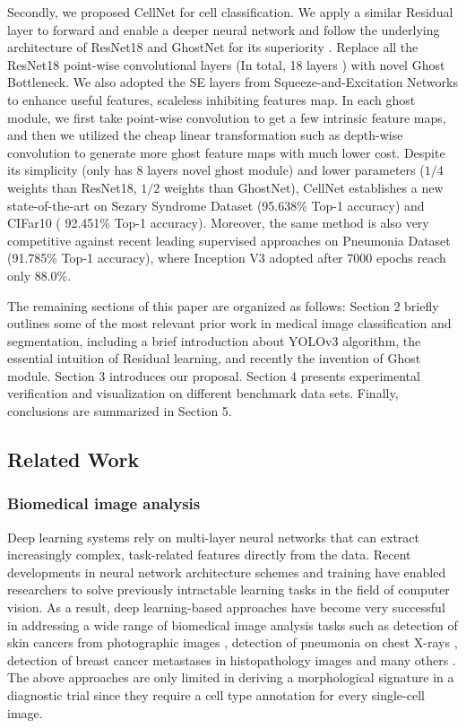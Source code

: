 Secondly, we proposed CellNet for cell classification. We apply a similar Residual layer to forward and enable a deeper neural network and follow the underlying architecture of ResNet18 and GhostNet for its superiority \cite{19}\cite{20}. Replace all the ResNet18 \cite{20} point-wise convolutional layers (In total, 18 layers ) with novel Ghost Bottleneck. We also adopted the SE layers from Squeeze-and-Excitation Networks \cite{24} to enhance useful features, scaleless inhibiting features map. In each ghost module, we first take point-wise convolution to get a few intrinsic feature maps, and then we utilized the cheap linear transformation such as depth-wise convolution to generate more ghost feature maps with much lower cost.
Despite its simplicity (only has 8 layers novel ghost module) and lower parameters ($1/4$ weights than ResNet18\cite{20}, $1/2$ weights than GhostNet\cite{19}), CellNet establishes a new state-of-the-art on Sezary Syndrome Dataset (95.638\% Top-1 accuracy) and CIFar10\cite{21} ( 92.451\% Top-1 accuracy). Moreover, the same method is also very competitive against recent leading supervised approaches on Pneumonia Dataset (91.785\% Top-1 accuracy), where Inception V3 adopted after 7000 epochs reach only 88.0\%\cite{38}. 

The remaining sections of this paper are organized as follows: Section 2 briefly outlines some of the most relevant prior work in medical image classification and segmentation, including a brief introduction about YOLOv3 \cite{33} algorithm, the essential intuition of Residual learning, and recently the invention of Ghost module.
Section 3 introduces our proposal. Section 4 presents experimental verification and visualization on different benchmark data sets. Finally, conclusions are summarized in Section 5.

\subsection{Related Work}
\subsubsection{Biomedical image analysis}

Deep learning systems rely on multi-layer neural networks that can extract increasingly complex, task-related features directly from the data. Recent developments in neural network architecture schemes and training have enabled researchers to solve previously intractable learning tasks in the field of computer vision. As a result, deep learning-based approaches have become very successful in addressing a wide range of biomedical image analysis tasks such as detection of skin cancers from photographic images \cite{10}, detection of pneumonia on chest X-rays \cite{13}, detection of breast cancer metastases in histopathology images and many others \cite{2}. 
The above approaches are only limited in deriving a morphological signature in a diagnostic trial since they require a cell type annotation for every single-cell image.


